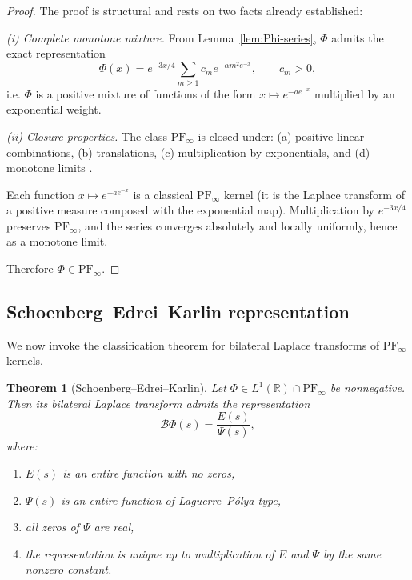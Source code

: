 \documentclass[12pt]{amsart}
\newtheorem{theorem}{Theorem}[section]
\theoremstyle{definition}
\theoremstyle{remark}
\begin{document}
\begin{proof}
The proof is structural and rests on two facts already established:

\smallskip
\noindent
\emph{(i) Complete monotone mixture.}
From Lemma~\ref{lem:Phi-series}, $\Phi$ admits the exact representation
\[
\Phi(x)
=
e^{-3x/4}\sum_{m\ge1} c_m e^{-\alpha m^2 e^{-x}},
\qquad c_m>0,
\]
i.e. $\Phi$ is a positive mixture of functions of the form
$x\mapsto e^{-a e^{-x}}$ multiplied by an exponential weight.

\smallskip
\noindent
\emph{(ii) Closure properties.}
The class $\mathrm{PF}_\infty$ is closed under:
(a) positive linear combinations,
(b) translations,
(c) multiplication by exponentials,
and (d) monotone limits
\cite[Chs.~I--III]{karlin1968total}.

\smallskip
Each function $x\mapsto e^{-a e^{-x}}$ is a classical $\mathrm{PF}_\infty$ kernel
(it is the Laplace transform of a positive measure composed with the exponential
map). Multiplication by $e^{-3x/4}$ preserves $\mathrm{PF}_\infty$, and the series
converges absolutely and locally uniformly, hence as a monotone limit.

Therefore $\Phi\in\mathrm{PF}_\infty$.
\end{proof}

\subsection{Schoenberg--Edrei--Karlin representation}

We now invoke the classification theorem for bilateral Laplace transforms of
$\mathrm{PF}_\infty$ kernels.

\begin{theorem}[Schoenberg--Edrei--Karlin]
\label{thm:SEK}
Let $\Phi\in L^1(\mathbb R)\cap \mathrm{PF}_\infty$ be nonnegative.
Then its bilateral Laplace transform admits the representation
\begin{equation}
\label{eq:SEK-form}
\mathcal B\Phi(s)
=
\frac{E(s)}{\Psi(s)},
\end{equation}
where:
\begin{enumerate}[label=(\roman*)]
\item $E(s)$ is an entire function with no zeros,
\item $\Psi(s)$ is an entire function of Laguerre--Pólya type,
\item all zeros of $\Psi$ are real,
\item the representation is unique up to multiplication of $E$ and $\Psi$ by the
same nonzero constant.
\end{enumerate}
\end{theorem}
\end{document}
